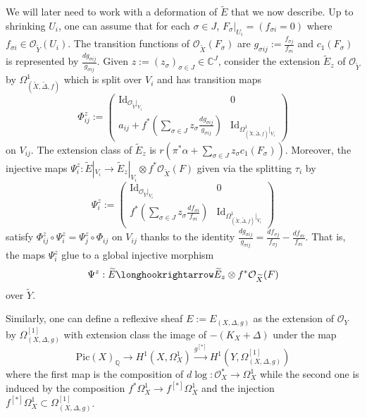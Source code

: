 \documentclass[12pt]{amsart}
\theoremstyle{definition}
\newcommand{\tX}{\widetilde{X}}
\newcommand{\tY}{\widetilde{Y}}
\newcommand{\tE}{\widetilde{E}}
\newcommand{\cO}{\mathcal{O}}
\numberwithin{equation}{section}
\newcommand{\tDe}{\widetilde \Delta}
\newcommand{\Q}{\mathbb Q}
\begin{document}
We will later need to work with a deformation of $\tE$ that we now describe. Up to shrinking $U_i$, one can assume that for each $\sigma \in J$, $F_\sigma|_{U_i}=(f_{\sigma i}=0)$ where $f_{\sigma i}\in \cO_{\tY}(U_i)$. The transition functions of $\cO_{\tX}(F_\sigma)$ are $g_{\sigma ij}:=\frac{f_{\sigma j}}{f_{\sigma i}}$ and $c_1(F_\sigma)$ is represented by $\frac{dg_{\sigma ij}}{g_{\sigma ij}}$. Given $z:=(z_\sigma)_{\sigma \in J}\in \mathbb C^J$, consider the extension $\tE_z$ of $\cO_{\tY}$ by $\Omega^1_{(\tX,\tDe, f)}$ which is split over $V_{i}$ and has transition maps
\[\Phi_{ij}^z:=
\begin{pmatrix}
\mathrm{Id}_{\cO_{\tY}|_{V_i}} &0 \\
a_{ij}+f^*(\sum_{\sigma \in J} z_\sigma \frac{dg_{\sigma ij}}{g_{\sigma ij}})& \mathrm{Id}_{\Omega^1_{(\tX,\tDe, f)}|_{V_i}}
\end{pmatrix}
\]
on $V_{ij}$. The extension class of $\tE_z$ is $r(\pi^*\alpha+\sum_{\sigma \in J}z_\sigma c_1(F_\sigma))$. Moreover, the injective maps $\Psi_i^z:\tE|_{V_i}\to \tE_z|_{V_i}\otimes f^*\cO_{\tX}(F)$ given via the splitting $\tau_i$ by
\[\Psi_i^z:=
\begin{pmatrix}
\mathrm{Id}_{\cO_{\tY}|_{V_i}} &0 \\
f^*(\sum_{\sigma \in J} z_\sigma \frac{df_{\sigma i}}{f_{\sigma i}})& \mathrm{Id}_{\Omega^1_{(\tX,\tDe, f)}|_{V_i}}
\end{pmatrix}
\]
satisfy $\Phi_{ij}^z \circ \Psi_i^z=\Psi_j^z \circ \Phi_{ij}$ on $V_{ij}$ thanks to the identity  $\frac{dg_{\sigma ij}}{g_{\sigma ij}}=\frac{df_{\sigma j}}{f_{\sigma j}}-\frac{df_{\sigma i}}{f_{\sigma i}}$. That is, the maps $\Psi_i^z$ glue to a global injective morphism 
\begin{equation}
\label{inj}
\Psi^z:\tE\longhookrightarrow \tE_z\otimes f^*\cO_{\tX}(F)
\end{equation} over $\tY$.

Similarly, one can define a reflexive sheaf $E:=E_{(X,\Delta,g)}$ as the extension of $\cO_Y$ by $\Omega^{[1]}_{(X,\Delta,g)}$ with extension class the image of $-(K_X+\Delta)$ under the map 
\begin{equation}
\label{ext map}
\mathrm{Pic}(X)_{\Q}\to H^1(X,\Omega_X^1) \overset{g^{[*]}}{\to}H^1(Y,\Omega_{(X,\Delta, g)}^{[1]})
\end{equation} 
where the first map is the composition of $d\log:\cO_X^*\to \Omega_X^1$ while the second one is induced by the composition $f^*\Omega_X^1\to f^{[*]}\Omega_X^1$ and the injection $f^{[*]}\Omega_X^1 \subset \Omega_{(X,\Delta, g)}^{[1]}$. 
\end{document}
